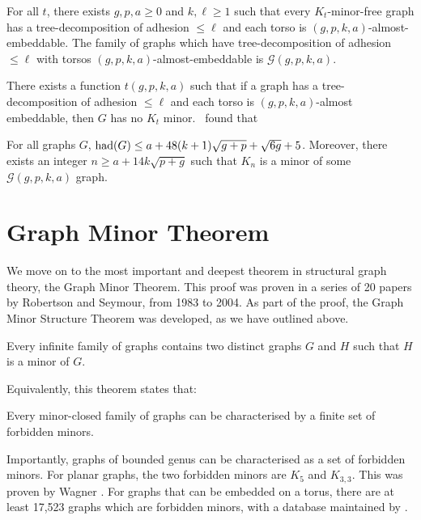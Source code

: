 \begin{theorem}
	For all \(t\), there exists \(g, p, a \geq 0\) and \(k, \ell \geq 1\) such that every \(K_t\)-minor-free graph has a tree-decomposition of adhesion \(\leq \ell\) and each torso is \((g, p, k, a)\)-almost-embeddable. The  family of graphs which have tree-decomposition of adhesion $\leq \ell$ with torsos $(g, p, k, a)$-almost-embeddable is \(\mathcal{G}(g, p, k, a)\). 
\end{theorem}
There exists a function \(t(g, p, k, a)\) such that if a graph has a tree-decomposition of adhesion \(\leq \ell\) and each torso is \((g, p, k, a)\)-almost embeddable, then \(G\) has no \(K_t\) minor.\ \textcite{joretCompleteGraphMinors2013} found that
\begin{theorem}\label{thm:graph_structure_bound_theorem}
	For all graphs \(G\),
	\(\operatorname{had}(G) \leq a + 48(k + 1)\sqrt{g + p} + \sqrt{6g} + 5\). Moreover, there exists an integer \(n \geq a + 1 4 k\sqrt{p + g}\) such that \(K_n\) is a minor of some \(\mathcal{G}(g, p, k, a)\) graph.
\end{theorem}

\section{Graph Minor Theorem}\label{sec:Graph Minor Theorem}
We move on to the most important and deepest theorem in structural graph theory, the Graph Minor Theorem. This proof was proven in a series of 20 papers by Robertson and Seymour, from 1983 to 2004. As part of the proof, the Graph Minor Structure Theorem was developed, as we have outlined above. 
\begin{theorem}
	Every infinite family of graphs contains two distinct graphs \(G\) and \(H\) such that \(H\) is a minor of \(G\).
\end{theorem}
Equivalently, this theorem states that:
\begin{theorem}
	Every minor-closed family of graphs can be characterised by a finite set of forbidden minors.
\end{theorem}
Importantly, graphs of bounded genus can be characterised as a set of forbidden minors.
For planar graphs, the two forbidden minors are \(K_5\) and \(K_{3,3}\). This was proven by Wagner \cite{wagnerUeberEigenschaftEbenen1937}. 
For graphs that can be embedded on a torus, there are at least 17,523 graphs which are forbidden minors, with a database maintained by \textcite{myrvoldLargeSetTorus2018}. 

